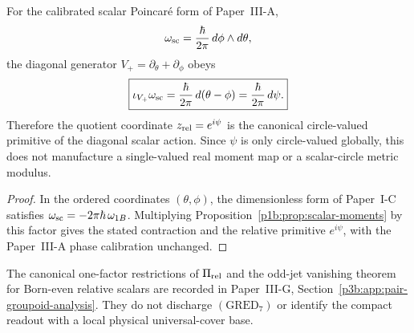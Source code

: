 \documentclass[12pt,a4paper]{article}
\begin{document}
\begin{corollary}
\label{p3b:cor:v181-relative-circle-moment}
For the calibrated scalar Poincar\'e form of Paper~III-A,
\[
 \omega_{\rm sc}=\frac{\hbar}{2\pi}\,d\phi\wedge d\theta,
\]
the diagonal generator $V_+=\partial_\theta+\partial_\phi$ obeys
\[
 \boxed{\iota_{V_+}\omega_{\rm sc}
 =\frac{\hbar}{2\pi}\,d(\theta-\phi)
 =\frac{\hbar}{2\pi}\,d\psi.}
\]
Therefore the quotient coordinate $z_{\rm rel}=e^{i\psi}$ is the canonical
circle-valued primitive of the diagonal scalar action.  Since $\psi$ is only
circle-valued globally, this does not manufacture a single-valued real moment
map or a scalar-circle metric modulus.
\end{corollary}
\begin{proof}
In the ordered coordinates \((\theta,\phi)\), the dimensionless form
of Paper~I-C satisfies
\(\omega_{\rm sc}=-2\pi\hbar\,\omega_{1B}\).  Multiplying
Proposition~\ref{p1b:prop:scalar-moments} by this factor gives the stated
contraction and the relative primitive \(e^{i\psi}\), with the
Paper~III-A phase calibration unchanged.
\end{proof}

\begin{remark}
The canonical one-factor restrictions of \(\Pi_{\rm rel}\) and the
odd-jet vanishing theorem for Born-even relative scalars are recorded in
Paper~III-G, Section~\ref{p3b:app:pair-groupoid-analysis}.  They do not discharge
\((\mathrm{GRED}_7)\) or identify the compact readout with a local physical
universal-cover base.
\end{remark}
\end{document}
